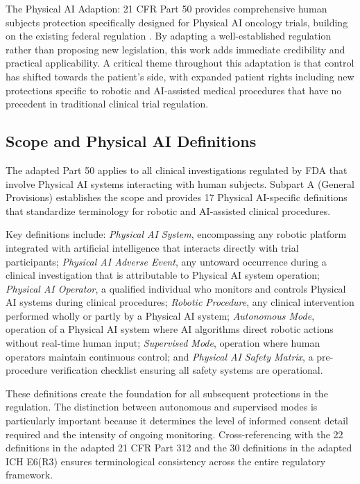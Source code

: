 
The Physical AI Adaption: 21 CFR Part 50 \cite{cfr50-adapt} provides
comprehensive human subjects protection specifically designed for Physical AI
oncology trials, building on the existing federal regulation \cite{cfr-part-50}.
By adapting a well-established regulation rather than proposing new legislation,
this work adds immediate credibility and practical applicability. A critical
theme throughout this adaptation is that control has shifted towards the
patient's side, with expanded patient rights including new protections specific
to robotic and AI-assisted medical procedures that have no precedent in
traditional clinical trial regulation.

\subsection{Scope and Physical AI Definitions}
\label{subsec:cfr50-scope}

The adapted Part 50 applies to all clinical investigations regulated by FDA that
involve Physical AI systems interacting with human subjects. Subpart A (General
Provisions) establishes the scope and provides 17 Physical AI-specific
definitions that standardize terminology for robotic and AI-assisted clinical
procedures.

Key definitions include: \textit{Physical AI System}, encompassing any robotic
platform integrated with artificial intelligence that interacts directly with
trial participants; \textit{Physical AI Adverse Event}, any untoward occurrence
during a clinical investigation that is attributable to Physical AI system
operation; \textit{Physical AI Operator}, a qualified individual who monitors
and controls Physical AI systems during clinical procedures; \textit{Robotic
Procedure}, any clinical intervention performed wholly or partly by a Physical
AI system; \textit{Autonomous Mode}, operation of a Physical AI system where AI
algorithms direct robotic actions without real-time human input;
\textit{Supervised Mode}, operation where human operators maintain continuous
control; and \textit{Physical AI Safety Matrix}, a pre-procedure verification
checklist ensuring all safety systems are operational.

These definitions create the foundation for all subsequent protections in the
regulation. The distinction between autonomous and supervised modes is
particularly important because it determines the level of informed consent
detail required and the intensity of ongoing monitoring. Cross-referencing with
the 22 definitions in the adapted 21 CFR Part 312 \cite{cfr312-adapt} and
the 30 definitions in the adapted ICH E6(R3) \cite{ich-adapt} ensures
terminological consistency across the entire regulatory framework.

